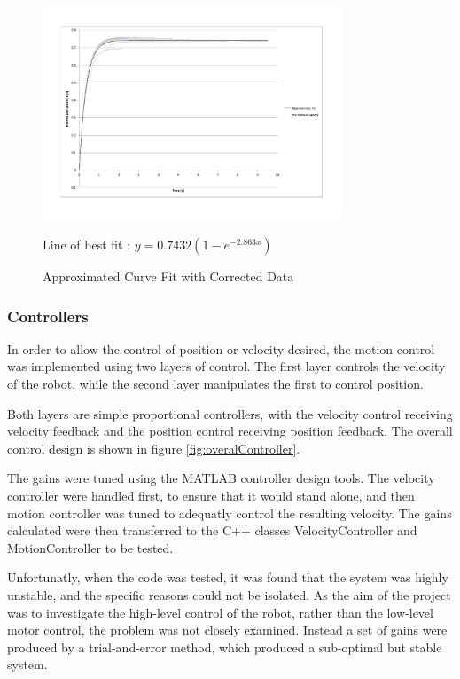 \documentclass[10pt]{article} \usepackage[a4paper]{geometry}
\begin{document}
\begin{figure}
 \centering
 \includegraphics[width=0.8\textwidth]{Images/approximate-fit-model-time-shift}
 \caption{Approximated Curve Fit with Corrected Data}
 \label{fig:approximateFitTimeShiftRemoved}
 
 Line of best fit : $y=0.7432 \left(1-e^{-2.863x}\right)$
\end{figure}

\subsubsection{Controllers}

In order to allow the control of position or velocity desired, the motion
control was implemented using two layers of control.  The first layer controls
the velocity of the robot, while the second layer manipulates the first to
control position.

Both layers are simple proportional controllers, with the velocity control
receiving velocity feedback and the position control receiving position
feedback.  The overall control design is shown in figure
\ref{fig:overalController}.  

The gains were tuned using the MATLAB controller design tools.  The velocity
controller were handled first, to ensure that it would stand alone, and then
motion controller was tuned to adequatly control the resulting velocity.  The
gains calculated were then transferred to the C++ classes VelocityController and
MotionController to be tested.

Unfortunatly, when the code was tested, it was found that the system was highly
unstable, and the specific reasons could not be isolated.  As the aim of the
project was to investigate the high-level control of the robot, rather than the
low-level motor control, the problem was not closely examined.  Instead a set of
gains were produced by a trial-and-error method, which produced a sub-optimal
but stable system.
\end{document}
